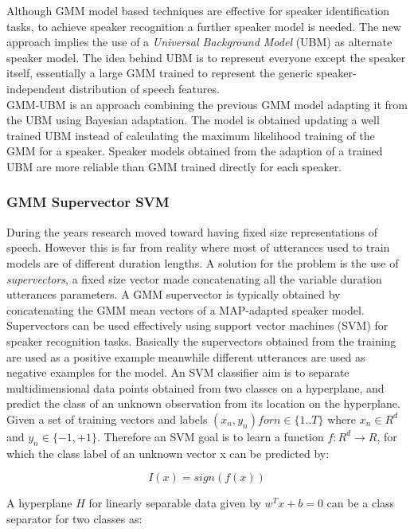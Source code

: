 Although GMM model based techniques are effective for speaker
identification tasks, to achieve speaker recognition a further
speaker model is needed. The new approach implies the use of
a \textit{Universal Background Model} (UBM) as alternate speaker model.
The idea behind UBM is to represent everyone except the speaker itself, essentially
a large GMM trained to represent the generic speaker-independent distribution
of speech features.\\
GMM-UBM is an approach combining the previous GMM model adapting it from
the UBM using Bayesian adaptation. The model is obtained updating a well
trained UBM instead of calculating the maximum likelihood training of the GMM
for a speaker. Speaker models obtained from the adaption of a trained UBM
are more reliable than GMM trained directly for each speaker.\cite{speaker-recognition}

\subsubsection{GMM Supervector SVM}

During the years research moved toward having fixed size representations
of speech. However this is far from reality where most of utterances used to train
models are of different duration lengths. A solution for the problem is the use of
\textit{supervectors}, a fixed size vector made concatenating all the variable duration
utterances parameters. A GMM supervector is typically obtained by concatenating
the GMM mean vectors of a MAP-adapted speaker model.\\
Supervectors can be used effectively using support vector machines (SVM) for speaker
recognition tasks. Basically the supervectors obtained from the training are used
as a positive example meanwhile different utterances are used as negative examples for
the model. An SVM classifier aim is to separate multidimensional data points obtained from two classes
on a hyperplane, and predict the class of an unknown observation from its location
on the hyperplane.
Given a set of training vectors and labels $(x_{n},y_{n}) for n \in \{1..T\}$ where
$x_{n} \in R^d$ and $y_{n} \in \{-1,+1\}$. Therefore an SVM goal is to learn
a function $f:R^d \rightarrow R$, for which the class label of an unknown vector x
can be predicted by:

\begin{equation}
    I(x)= sign(f(x))
\end{equation}

A hyperplane $H$ for linearly separable data given by $w^Tx+b = 0$ can be a class separator for
two classes as:

